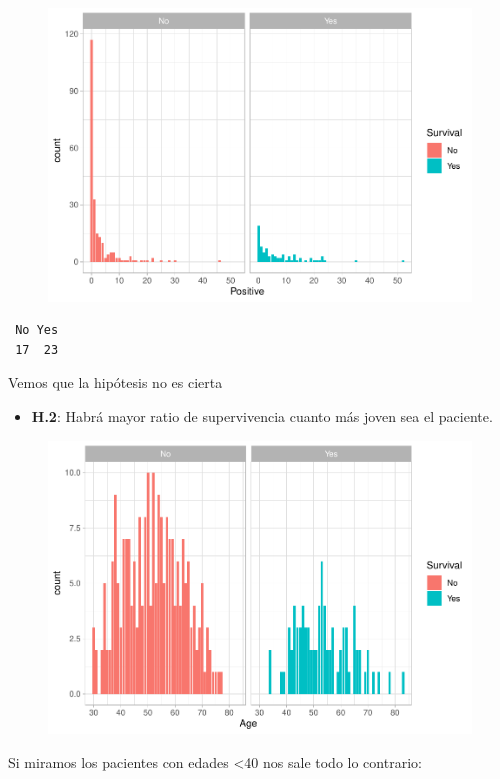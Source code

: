 \begin{figure}[H]\includegraphics[width=.9\linewidth]{img/EDA2_files/figure-latex/unnamed-chunk-31-1} \end{figure}

\begin{verbatim}
 No Yes 
 17  23 
\end{verbatim}

Vemos que la hipótesis no es cierta

\begin{itemize}
    \item \textbf{H.2}: Habrá mayor ratio de supervivencia cuanto más joven sea el paciente.
\end{itemize}

\begin{figure}[H]\includegraphics[width=.9\linewidth]{img/EDA2_files/figure-latex/unnamed-chunk-33-1} \end{figure}

Si miramos los pacientes con edades \textless40 nos sale todo lo contrario:

